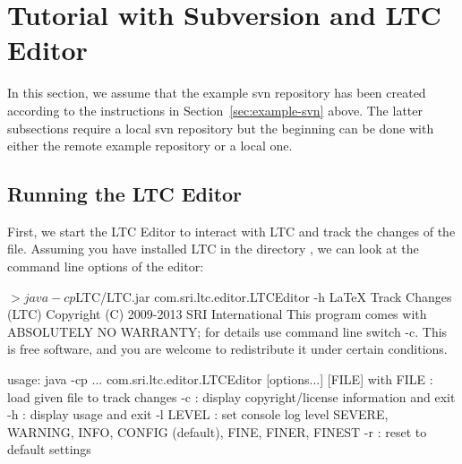 \section{Tutorial with Subversion and LTC Editor} \label{sec:tutorial-svn}

In this section, we assume that the example svn repository has been created according to the instructions in Section~\ref{sec:example-svn} above.  The latter subsections require a local svn repository but the beginning can be done with either the remote example repository or a local one.  

\subsection{Running the LTC Editor}

First, we start the LTC Editor to interact with LTC and track the changes of the file.  Assuming you have installed LTC in the directory , we can look at the command line options of the editor:
\begin{CodeVerbatim}[commandchars=\\\{\}]
$> java -cp $LTC/LTC.jar com.sri.ltc.editor.LTCEditor -h
LaTeX Track Changes (LTC)  Copyright (C) 2009-2013  SRI International
This program comes with ABSOLUTELY NO WARRANTY; for details use command line switch -c.
This is free software, and you are welcome to redistribute it under certain conditions.

usage: java -cp ... com.sri.ltc.editor.LTCEditor [options...] [FILE] 
with
 FILE     : load given file to track changes
 -c       : display copyright/license information and exit
 -h       : display usage and exit
 -l LEVEL : set console log level
            SEVERE, WARNING, INFO, CONFIG (default), FINE, FINER, FINEST
 -r       : reset to default settings
\end{CodeVerbatim}

